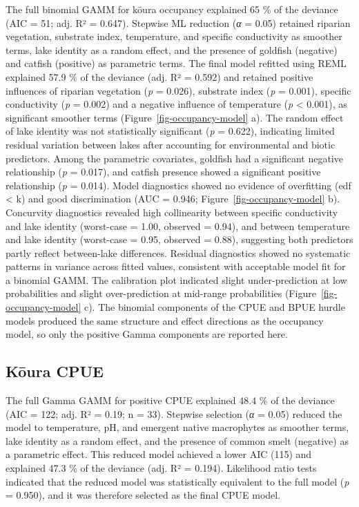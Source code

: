 \documentclass[
  12pt,
  a4paper,
  oneside]{scrbook}
\begin{document}
The full binomial GAMM for kōura occupancy explained 65 \% of the
deviance (AIC = 51; adj. R² = 0.647). Stepwise ML reduction (\emph{α} =
0.05) retained riparian vegetation, substrate index, temperature, and
specific conductivity as smoother terms, lake identity as a random
effect, and the presence of goldfish (negative) and catfish (positive)
as parametric terms. The final model refitted using REML explained 57.9
\% of the deviance (adj. R² = 0.592) and retained positive influences of
riparian vegetation (\emph{p} = 0.026), substrate index (\emph{p} =
0.001), specific conductivity (\emph{p} = 0.002) and a negative
influence of temperature (\emph{p} \textless{} 0.001), as significant
smoother terms (Figure~\ref{fig-occupancy-model} a). The random effect
of lake identity was not statistically significant (\emph{p} = 0.622),
indicating limited residual variation between lakes after accounting for
environmental and biotic predictors. Among the parametric covariates,
goldfish had a significant negative relationship (\emph{p} = 0.017), and
catfish presence showed a significant positive relationship (\emph{p} =
0.014). Model diagnostics showed no evidence of overfitting (edf
\textless{} k) and good discrimination (AUC = 0.946;
Figure~\ref{fig-occupancy-model} b). Concurvity diagnostics revealed
high collinearity between specific conductivity and lake identity
(worst-case = 1.00, observed = 0.94), and between temperature and lake
identity (worst-case = 0.95, observed = 0.88), suggesting both
predictors partly reflect between-lake differences. Residual diagnostics
showed no systematic patterns in variance across fitted values,
consistent with acceptable model fit for a binomial GAMM. The
calibration plot indicated slight under-prediction at low probabilities
and slight over-prediction at mid-range probabilities
(Figure~\ref{fig-occupancy-model} c). The binomial components of the
CPUE and BPUE hurdle models produced the same structure and effect
directions as the occupancy model, so only the positive Gamma components
are reported here.

\subsection{Kōura CPUE}\label{kux14dura-cpue}

The full Gamma GAMM for positive CPUE explained 48.4 \% of the deviance
(AIC = 122; adj. R² = 0.19; n = 33). Stepwise selection (\emph{α} =
0.05) reduced the model to temperature, pH, and emergent native
macrophytes as smoother terms, lake identity as a random effect, and the
presence of common smelt (negative) as a parametric effect. This reduced
model achieved a lower AIC (115) and explained 47.3 \% of the deviance
(adj. R² = 0.194). Likelihood ratio tests indicated that the reduced
model was statistically equivalent to the full model (\emph{p} = 0.950),
and it was therefore selected as the final CPUE model.
\end{document}
